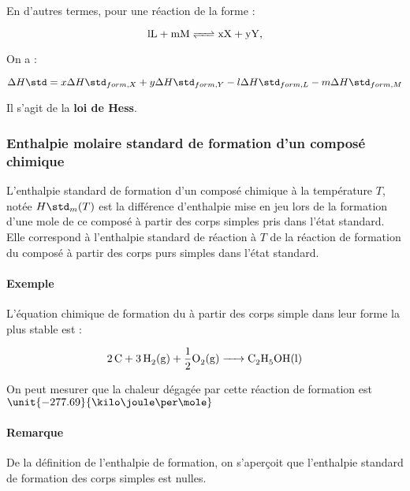 En d'autres termes, pour une réaction de la forme :

$$\ce{lL + mM <=> xX + yY},$$

On a :

$$\Delta H\std = x \Delta H\std_{form, X} + y \Delta H\std_{form, Y} -  l \Delta H\std_{form, L} -  
m \Delta H\std_{form, M}$$

Il s'agit de la \textbf{loi de Hess}.

\subsubsection{Enthalpie molaire standard de formation d'un composé chimique}
L'enthalpie standard de formation d'un composé chimique à la température
$T$, notée $H\std_m(T)$ est la différence d'enthalpie mise en jeu lors de 
la formation d'une mole de ce composé à partir des corps simples pris dans 
l'état standard. Elle correspond à l'enthalpie standard de réaction à $T$
de la réaction de formation du composé à partir des corps purs simples dans
l'état standard.

\paragraph{Exemple}
L'équation chimique de formation du  à partir
des corps simple dans leur forme la plus stable est :

$$\ce{2C + 3H_2(g) + \frac{1}{2}O_2(g) -> C_2H_5OH(l)}$$

On peut mesurer que la chaleur dégagée par cette réaction de formation
est $\unit{-277.69}{\kilo\joule\per\mole}$

\paragraph{Remarque}
De la définition de l'enthalpie de formation, on s'aperçoit
que l'enthalpie standard de formation des corps simples est nulles.

